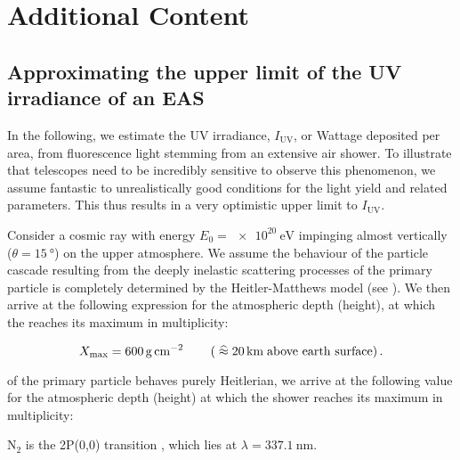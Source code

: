 
\chapter{Additional Content}
\label{app:other}

\section{Approximating the upper limit of the UV irradiance of an EAS}
\label{app:cr-uv-irradiance}

In the following, we estimate the UV irradiance, $I_\text{UV}$, or Wattage 
deposited per area, from fluorescence light stemming from an extensive air 
shower. To illustrate that telescopes need to be incredibly sensitive to 
observe this phenomenon, we assume fantastic to unrealistically good conditions
for the \UV light yield and related parameters. This thus results in a very 
optimistic upper limit to $I_\text{UV}$.

Consider a cosmic ray with energy $E_0 = \SI{e20}{\eV}$ impinging almost 
vertically ($\theta=\SI{15}{\degree}$) on the upper atmosphere.
We assume the behaviour of the particle cascade resulting from the deeply 
inelastic scattering processes of the primary particle is completely determined 
by the Heitler-Matthews model (see ). We then arrive at the 
following expression for the atmospheric depth (height), at which the \EAS 
reaches its maximum in multiplicity:

\begin{equation}
\label{eq:irradiance-multiplicity}
X_\mathrm{max} = \SI{600}{\gram\per\centi\meter\squared}\qquad\left(\;\widehat{\approx}\;\SI{20}{\kilo\meter}\;\text{above earth surface} \right).
\end{equation}



of the primary particle behaves purely Heitlerian, we arrive at
the following value for the atmospheric depth (height) at which the shower 
reaches its maximum in multiplicity:

$\text{N}_2$ is the 2P(0,0)
transition \cite{Ave2008}, which lies at $\lambda=\SI{337.1}{\nano\meter}$.
